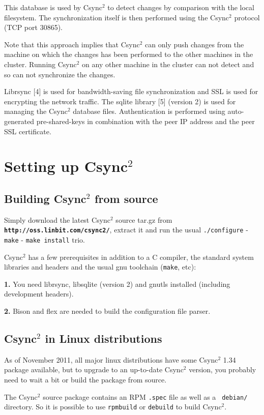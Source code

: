 \documentclass[a4paper,twocolumn]{article}
\def\csync2{{\sc Csync$^{2}$}}
\begin{document}
This database is used by \csync2 to detect changes by comparison with the local
filesystem. The synchronization itself is then performed using the \csync2
protocol (TCP port 30865).

Note that this approach implies that \csync2 can only push changes from the
machine on which the changes has been performed to the other machines in the
cluster. Running \csync2 on any other machine in the cluster can not detect and
so can not synchronize the changes.

Librsync [4] is used for bandwidth-saving file synchronization and SSL is used for
encrypting the network traffic. The sqlite library [5] (version 2) is used for
managing the \csync2 database files. Authentication is performed using
auto-generated pre-shared-keys in combination with the peer IP address and
the peer SSL certificate.

\section{Setting up \csync2}

\subsection{Building \csync2 from source}

Simply download the latest \csync2 source tar.gz from {\bf \tt http://oss.linbit.com/csync2/},
extract it and run the usual {\tt ./configure} - {\tt make} - {\tt make install} trio.

\csync2 has a few prerequisites in addition to a C compiler, the standard
system libraries and headers and the usual gnu toolchain ({\tt make}, etc):

{\bf 1.} You need librsync, libsqlite (version 2) and gnutls installed
(including development headers).

{\bf 2.} Bison and flex are needed to build the configuration file parser.

\subsection{\csync2 in Linux distributions}

As of November 2011, all major linux distributions have some \csync2 1.34 package
available, but to upgrade to an up-to-date \csync2 version, you probably need
to wait a bit or build the package from source.

The \csync2 source package contains an RPM {\tt .spec} file as well as a {\tt
debian/} directory. So it is possible to use {\tt rpmbuild} or {\tt debuild} to
build \csync2.
\end{document}
